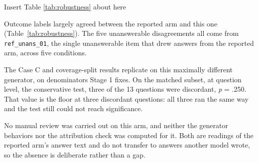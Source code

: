 {\centering\noindent Insert Table \ref{tab:robustness} about here\par}

Outcome labels largely agreed between the reported arm and this one
(Table~\ref{tab:robustness}). The five unanswerable disagreements all come from
\texttt{ref\_unans\_01}, the
single unanswerable item that drew answers from the reported arm, across five
conditions.

The Case C and coverage-split results replicate on this maximally different
generator, on denominators Stage 1 fixes. On the matched subset, at question
level, the conservative test, three of the 13 questions were discordant,
\emph{p} = .250. That value is the floor at three discordant questions: all
three ran the same way and the test still could not reach significance.

No manual review was carried out on this arm, and neither the generator
behaviors nor the attribution check was computed for it. Both are readings of
the reported arm's answer text and do not transfer to answers another model
wrote, so the absence is deliberate rather than a gap.

